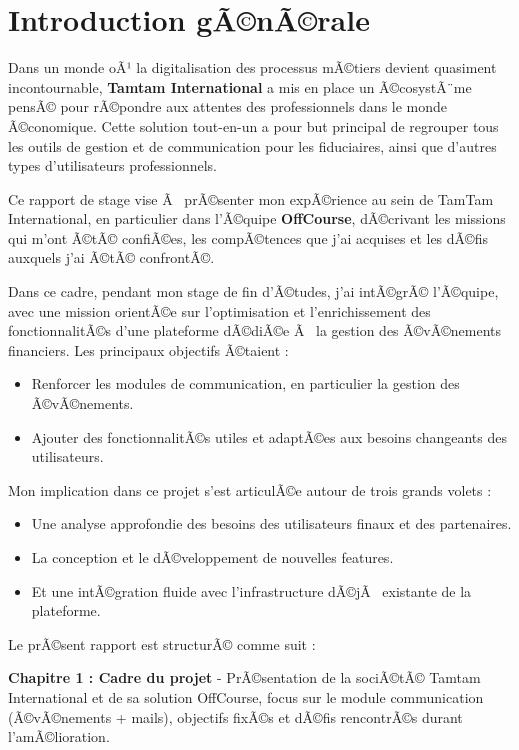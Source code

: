 \documentclass{rapportPFEHIND}
\begin{document}
\cleardoublepage
{}
\setcounter{page}{1}

\section*{Introduction gÃ©nÃ©rale}

Dans un monde oÃ¹ la digitalisation des processus mÃ©tiers devient quasiment incontournable, \textbf{Tamtam International} a mis en place un Ã©cosystÃ¨me pensÃ© pour rÃ©pondre aux attentes des professionnels dans le monde Ã©conomique. Cette solution tout-en-un a pour but principal de regrouper tous les outils de gestion et de communication pour les fiduciaires, ainsi que d'autres types d'utilisateurs professionnels.

Ce rapport de stage vise Ã  prÃ©senter mon expÃ©rience au sein de TamTam International, en particulier dans l'Ã©quipe \textbf{OffCourse}, dÃ©crivant les missions qui m'ont Ã©tÃ© confiÃ©es, les compÃ©tences que j'ai acquises et les dÃ©fis auxquels j'ai Ã©tÃ© confrontÃ©.

Dans ce cadre, pendant mon stage de fin d'Ã©tudes, j'ai intÃ©grÃ© l'Ã©quipe, avec une mission orientÃ©e sur l'optimisation et l'enrichissement des fonctionnalitÃ©s d'une plateforme dÃ©diÃ©e Ã  la gestion des Ã©vÃ©nements financiers. Les principaux objectifs Ã©taient :
\begin{itemize}
    \item Renforcer les modules de communication, en particulier la gestion des Ã©vÃ©nements.
    \item Ajouter des fonctionnalitÃ©s utiles et adaptÃ©es aux besoins changeants des utilisateurs.
\end{itemize}

Mon implication dans ce projet s'est articulÃ©e autour de trois grands volets :
\begin{itemize}
    \item Une analyse approfondie des besoins des utilisateurs finaux et des partenaires.
    \item La conception et le dÃ©veloppement de nouvelles features.
    \item Et une intÃ©gration fluide avec l'infrastructure dÃ©jÃ  existante de la plateforme.
\end{itemize}

Le prÃ©sent rapport est structurÃ© comme suit :

\textbf{Chapitre 1 : Cadre du projet} - PrÃ©sentation de la sociÃ©tÃ© Tamtam International et de sa solution OffCourse, focus sur le module communication (Ã©vÃ©nements + mails), objectifs fixÃ©s et dÃ©fis rencontrÃ©s durant l'amÃ©lioration.
\end{document}
